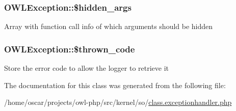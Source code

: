 \subsubsection[{\$hidden\_\-args}]{\setlength{\rightskip}{0pt plus 5cm}OWLException::\$hidden\_\-args}\label{classOWLException_a6f55c054dd20e494abe9db9a9494bdda}
Array with function call info of which arguments should be hidden 
\subsubsection[{\$thrown\_\-code}]{\setlength{\rightskip}{0pt plus 5cm}OWLException::\$thrown\_\-code}\label{classOWLException_abd34d579d5f578f2e08a04c987dbea1a}
Store the error code to allow the logger to retrieve it 

The documentation for this class was generated from the following file:\begin{DoxyCompactItemize}
\item 
/home/oscar/projects/owl-\/php/src/kernel/so/\hyperlink{class_8exceptionhandler_8php}{class.exceptionhandler.php}\end{DoxyCompactItemize}
